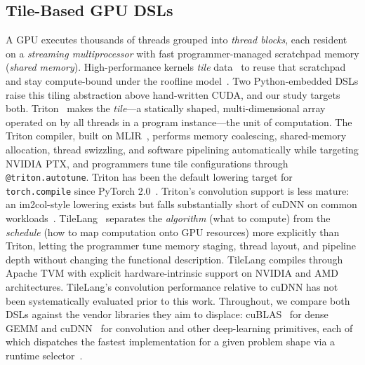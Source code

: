 \subsection{Tile-Based GPU DSLs}
\label{sec:bg:dsls}
A GPU executes thousands of threads grouped into \emph{thread blocks}, each resident on a \emph{streaming multiprocessor} with fast programmer-managed scratchpad memory (\emph{shared memory}). High-performance kernels \emph{tile} data~\cite{wolfe1989more} to reuse that scratchpad and stay compute-bound under the roofline model~\cite{williams2009roofline}.
Two Python-embedded DSLs raise this tiling abstraction above hand-written CUDA, and our study targets both.
Triton~\cite{tillet2019triton} makes the \emph{tile}---a statically shaped, multi-dimensional array operated on by all threads in a program instance---the unit of computation.
The Triton compiler, built on MLIR~\cite{lattner2021mlir}, performs memory coalescing, shared-memory allocation, thread swizzling, and software pipelining automatically while targeting NVIDIA PTX, and programmers tune tile configurations through \texttt{@triton.autotune}.
Triton has been the default lowering target for \texttt{torch.compile} since PyTorch 2.0~\cite{li2023torchcompile}.
Triton's convolution support is less mature: an im2col-style lowering exists but falls substantially short of cuDNN on common workloads~\cite{triton2022conv591}.
TileLang~\cite{wang2025tilelang} separates the \emph{algorithm} (what to compute) from the \emph{schedule} (how to map computation onto GPU resources) more explicitly than Triton, letting the programmer tune memory staging, thread layout, and pipeline depth without changing the functional description.
TileLang compiles through Apache TVM with explicit hardware-intrinsic support on NVIDIA and AMD architectures.
TileLang's convolution performance relative to cuDNN has not been systematically evaluated prior to this work.
Throughout, we compare both DSLs against the vendor libraries they aim to displace: cuBLAS~\cite{cublas2024} for dense GEMM and cuDNN~\cite{chetlur2014cudnn} for convolution and other deep-learning primitives, each of which dispatches the fastest implementation for a given problem shape via a runtime selector~\cite{cutlass2023}.

